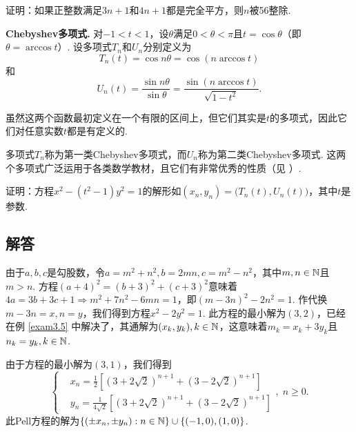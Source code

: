 \begin{problem}
  证明：如果正整数满足$3n+1$和$4n+1$都是完全平方，则$n$被56整除.
\end{problem}

\begin{mybox}
  \textbf{Chebyshev多项式.} 对$-1<t<1$，设$\theta$满足$0<\theta<\pi$且$t=\cos\theta$（即$\theta=\arccos t$）. 设多项式$T_n$和$U_n$分别定义为
  \[
    T_n(t) = \cos n\theta = \cos (n\arccos t)
  \]
  和
  \[
    U_n(t) = \frac{\sin n\theta}{\sin \theta}
    = \frac{\sin (n\arccos t)}{\sqrt{1-t^2}}.
  \]

  虽然这两个函数最初定义在一个有限的区间上，但它们其实是$t$的多项式，因此它们对任意实数$t$都是有定义的.

  多项式$T_n$称为{\kaishu 第一类Chebyshev多项式}，而$U_n$称为{\kaishu 第二类Chebyshev多项式}. 这两个多项式广泛运用于各类数学教材，且它们有非常优秀的性质（见 \cite[Section 3.4]{8}）.
  \begin{problem}

  证明：方程$x^2-(t^2-1)y^2=1$的解形如$(x_n,y_n)=\big(T_n(t),U_n(t)\big)$，其中$t$是参数.
  \end{problem}
\end{mybox}

\subsection{解答}
\begin{solution}
  由于$a,b,c$是勾股数，令$a=m^2+n^2,b=2mn,c=m^2-n^2$，其中$m,n\in\mathbb N$且$m>n$. 方程$(a+4)^2=(b+3)^2+(c+3)^2$意味着$4a=3b+3c+1\Rightarrow m^2+7n^2-6mn=1$，即$(m-3n)^2-2n^2=1$. 作代换$m-3n=x,n=y$，我们得到方程$x^2-2y^2=1$. 此方程的最小解为$(3,2)$，已经在例 \ref{exam3.5} 中解决了，其通解为$(x_k,y_k),k\in\mathbb N$，这意味着$m_k=x_k+3y_k$且$n_k=y_k,k\in\mathbb N$.
\end{solution}

\begin{solution}
  由于方程的最小解为$(3,1)$，我们得到
  \[
    \left\{
    \begin{aligned}
      & x_n = \frac12\left[
        \left( 3 + 2\sqrt 2 \right)^{n+1} +
        \left( 3 - 2\sqrt 2 \right)^{n+1}
      \right] \\
      & y_n = \frac1{4\sqrt 2}\left[
        \left( 3 + 2\sqrt 2 \right)^{n+1} +
        \left( 3 - 2\sqrt 2 \right)^{n+1}
      \right]
    \end{aligned}
    \right.,\; n\ge 0.
  \]
  此Pell方程的解为$\{(\pm x_n,\pm y_n):n\in\mathbb N\}
  \cup\{(-1,0),(1,0)\}$.
\end{solution}

